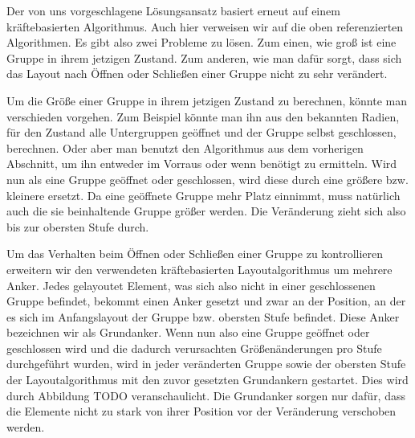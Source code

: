 Der von uns vorgeschlagene Lösungsansatz basiert erneut auf einem kräftebasierten Algorithmus. Auch hier verweisen wir auf die oben referenzierten Algorithmen. Es gibt also zwei Probleme zu lösen. Zum einen, wie groß ist eine Gruppe in ihrem jetzigen Zustand.  Zum anderen, wie man dafür sorgt, dass sich das Layout nach Öffnen oder Schließen einer Gruppe nicht zu sehr verändert.

Um die Größe einer Gruppe in ihrem jetzigen Zustand zu berechnen, könnte man verschieden vorgehen. Zum Beispiel könnte man ihn aus den bekannten Radien, für den Zustand alle Untergruppen geöffnet und der Gruppe selbst geschlossen, berechnen. Oder aber man benutzt den Algorithmus aus dem vorherigen Abschnitt, um ihn entweder im Vorraus oder wenn benötigt zu ermitteln. Wird nun als eine Gruppe geöffnet oder geschlossen, wird diese durch eine größere bzw. kleinere ersetzt. Da eine geöffnete Gruppe mehr Platz einnimmt, muss natürlich auch die sie beinhaltende Gruppe größer werden. Die Veränderung zieht sich also bis zur obersten Stufe durch.

Um das Verhalten beim Öffnen oder Schließen einer Gruppe zu kontrollieren erweitern wir den verwendeten kräftebasierten Layoutalgorithmus um mehrere Anker. Jedes gelayoutet Element, was sich also nicht in einer geschlossenen Gruppe befindet, bekommt einen Anker gesetzt und zwar an der Position, an der es sich im Anfangslayout der Gruppe bzw. obersten Stufe befindet. Diese Anker bezeichnen wir als Grundanker. Wenn nun also eine Gruppe geöffnet oder geschlossen wird und die dadurch verursachten Größenänderungen pro Stufe durchgeführt wurden, wird in jeder veränderten Gruppe sowie der obersten Stufe der Layoutalgorithmus mit den zuvor gesetzten Grundankern gestartet. Dies wird  durch Abbildung TODO veranschaulicht. Die Grundanker sorgen nur dafür, dass die Elemente nicht zu stark von ihrer Position vor der Veränderung verschoben werden.

